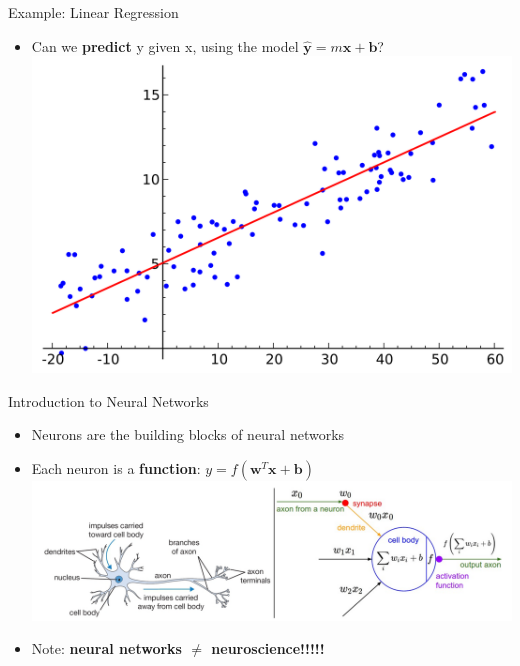 \documentclass{beamer}
\begin{document}
\begin{frame}{Example: Linear Regression}
\begin{itemize}
    \item Can we \textbf{predict} y given x, using the model $\hat{\textbf{y}}=m\textbf{x}+\textbf{b}$?
    \includegraphics[scale=0.2]{LinReg.png}

\end{itemize}

\end{frame}

\begin{frame}{Introduction to Neural Networks}
\begin{itemize}
    \item Neurons are the building blocks of neural networks
    \item Each neuron is a \textbf{function}: $y=f(\textbf{w}^{T}\textbf{x}+\textbf{b})$
    \includegraphics[scale=0.4]{Neuron.png}
    \item Note: \textbf{neural networks $\neq$ neuroscience!!!!!}
\end{itemize}
\end{frame}
\end{document}
